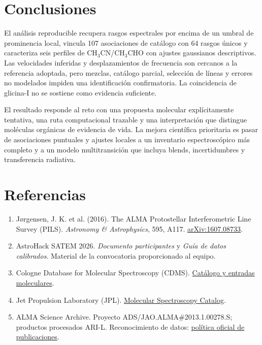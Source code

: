 \documentclass[10pt]{article}
\begin{document}
\section{Conclusiones}
El análisis reproducible recupera rasgos espectrales por encima de un umbral de prominencia local, vincula 107 asociaciones de catálogo con 64 rasgos únicos y caracteriza seis perfiles de CH$_3$CN/CH$_3$CHO con ajustes gaussianos descriptivos. Las velocidades inferidas y desplazamientos de frecuencia son cercanos a la referencia adoptada, pero mezclas, catálogo parcial, selección de líneas y errores no modelados impiden una identificación confirmatoria. La coincidencia de glicina-I no se sostiene como evidencia suficiente.

El resultado responde al reto con una propuesta molecular explícitamente tentativa, una ruta computacional trazable y una interpretación que distingue moléculas orgánicas de evidencia de vida. La mejora científica prioritaria es pasar de asociaciones puntuales y ajustes locales a un inventario espectroscópico más completo y a un modelo multitransición que incluya blends, incertidumbres y transferencia radiativa.

\section*{Referencias}
\begin{enumerate}
  \item Jørgensen, J. K. et al. (2016). The ALMA Protostellar Interferometric Line Survey (PILS). \emph{Astronomy \& Astrophysics}, 595, A117. \href{https://arxiv.org/abs/1607.08733}{arXiv:1607.08733}.
  \item AstroHack SATEM 2026. \emph{Documento participantes} y \emph{Guía de datos calibrados}. Material de la convocatoria proporcionado al equipo.
  \item Cologne Database for Molecular Spectroscopy (CDMS). \href{https://cdms.astro.uni-koeln.de/classic/entries/}{Catálogo y entradas moleculares}.
  \item Jet Propulsion Laboratory (JPL). \href{https://spec.jpl.nasa.gov/}{Molecular Spectroscopy Catalog}.
  \item ALMA Science Archive. Proyecto ADS/JAO.ALMA\#2013.1.00278.S; productos procesados ARI-L. Reconocimiento de datos: \href{https://almascience.eso.org/alma-data/publication-acknowledgement}{política oficial de publicaciones}.
\end{enumerate}
\end{document}
